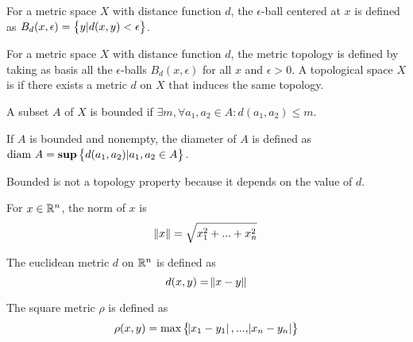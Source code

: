 \begin{definition}
    For a metric space $X$ with distance function $d$, the $\epsilon$-ball centered at $x$ is defined as $B_d(x, \epsilon) = \set{y | d(x,y) < \epsilon}$.
\end{definition}

\begin{definition}
    For a metric space $X$ with distance function $d$, the metric topology is defined by taking as basis all the $\epsilon$-balls $B_d(x,\epsilon)$ for all $x$ and $\epsilon > 0$. A topological space $X$ is  if there exists a metric $d$ on $X$ that induces the same topology.
\end{definition}

\begin{definition}
    A subset $A$ of $X$ is bounded if $\exists m, \forall a_1, a_2 \in A: d(a_1, a_2) \leq m$. 
\end{definition}

\begin{definition}
    If $A$ is bounded and nonempty, the diameter of $A$ is defined as $\text{diam } A = \mathbf{sup} \set{d(a_1, a_2)| a_1, a_2 \in A}$.
    
    Bounded is not a topology property because it depends on the value of $d$.
\end{definition}


\begin{definition}
    For $x \in \mathbb{R}^n$, the norm of $x$ is 
    \begin{equation}
        \norm{x} = \sqrt{x_1^2 + ... + x_n^2}
    \end{equation}
\end{definition}

\begin{definition}
    The euclidean metric \emph{$d$} on $\mathbb{R}^n$ is defined as
    \begin{equation}
        d(x,y) = \norm{x - y}
    \end{equation}
\end{definition}

\begin{definition}
    The square metric \emph{$\rho$} is defined as
    \begin{equation}
        \rho (x,y) = \text{max}\set{\abs{x_1 - y_1}, ... , \abs{x_n - y_n} }
    \end{equation}
\end{definition}


